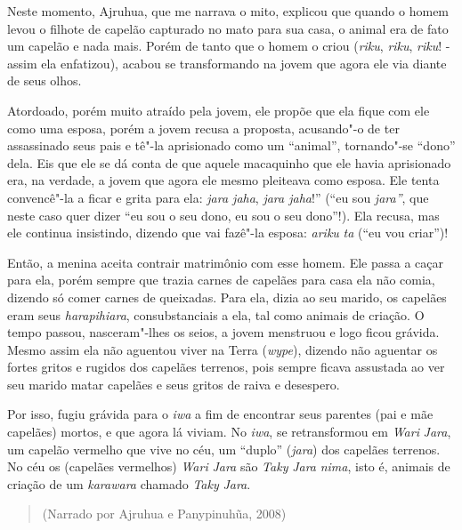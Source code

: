 Neste momento, Ajruhua, que me narrava o mito, explicou que quando o
homem levou o filhote de capelão capturado no mato para sua casa, o
animal era de fato um capelão e nada mais. Porém de tanto que o homem o
criou (\emph{riku}, \emph{riku}, \emph{riku}! - assim ela enfatizou),
acabou se transformando na jovem que agora ele via diante de seus olhos.

Atordoado, porém muito atraído pela jovem, ele propõe que ela fique com
ele como uma esposa, porém a jovem recusa a proposta, acusando"-o de ter
assassinado seus pais e tê"-la aprisionado como um ``animal'',
tornando"-se ``dono'' dela. Eis que ele se dá conta de que aquele
macaquinho que ele havia aprisionado era, na verdade, a jovem que agora
ele mesmo pleiteava como esposa. Ele tenta convencê"-la a ficar e grita
para ela: \emph{jara jaha}, \emph{jara jaha}!'' (``eu sou \emph{jara''},
que neste caso quer dizer ``eu sou o seu dono, eu sou o seu dono''!). Ela
recusa, mas ele continua insistindo, dizendo que vai fazê"-la esposa:
\emph{ariku} \emph{ta} (``eu vou criar'')!

Então, a menina aceita contrair matrimônio com esse homem. Ele passa a
caçar para ela, porém sempre que trazia carnes de capelães para casa ela
não comia, dizendo só comer carnes de queixadas. Para ela, dizia ao seu
marido, os capelães eram seus \emph{harapihiara}, consubstanciais a ela,
tal como animais de criação. O tempo passou, nasceram"-lhes os seios, a
jovem menstruou e logo ficou grávida. Mesmo assim ela não aguentou viver
na Terra (\emph{wype}), dizendo não aguentar os fortes gritos e rugidos
dos capelães terrenos, pois sempre ficava assustada ao ver seu marido
matar capelães e seus gritos de raiva e desespero.

Por isso, fugiu grávida para o \emph{iwa} a fim de encontrar seus
parentes (pai e mãe capelães) mortos, e que agora lá viviam. No
\emph{iwa}, se retransformou em \emph{Wari} \emph{Jara}, um capelão
vermelho que vive no céu, um ``duplo'' (\emph{jara}) dos capelães
terrenos. No céu os (capelães vermelhos) \emph{Wari} \emph{Jara} são
\emph{Taky} \emph{Jara} \emph{nima}, isto é, animais de criação de um
\emph{karawara} chamado \emph{Taky} \emph{Jara}.

\begin{quote}
(Narrado por Ajruhua e Panypinuhũa, 2008)
\end{quote}

